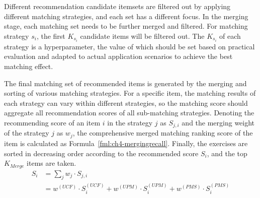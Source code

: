 
Different recommendation candidate itemsets are filtered out by applying different matching strategies, and each set has a different focus. In the merging stage, each matching set needs to be further merged and filtered. For matching strategy \(s_i\), the first \(K_{s_i}\) candidate items will be filtered out. The \(K_{s_i}\) of each strategy is a hyperparameter, the value of which should be set based on practical evaluation and adapted to actual application scenarios to achieve the best matching effect.

The final matching set of recommended items is generated by the merging and sorting of various matching strategies. For a specific item, the matching results of each strategy can vary within different strategies, so the matching score should aggregate all recommendation scores of all sub-matching strategies.  Denoting the recommending score of an item \(i\) in the strategy \(j\) as \(S_{j, i}\) and the merging weight of the strategy \(j\) as \(w_j\), the comprehensive merged matching ranking score of the item is calculated as Formula~\ref{fml:ch4-mergingrecall}. Finally, the exercises are sorted in decreasing order according to the recommended score \(S_i\), and the top \(K_{Merge}\) items are taken.
\begin{equation}
  \begin{align}\label{fml:ch4-mergingrecall}
    S_i & = \sum_{j}{w_j\cdot S_{j,i}}                                                       \\
        & = w^{(UCF)}\cdot S^{(UCF)}_i+w^{(UPM)}\cdot S^{(UPM)}_i+w^{(PMS)}\cdot S^{(PMS)}_i
  \end{align}
\end{equation}



